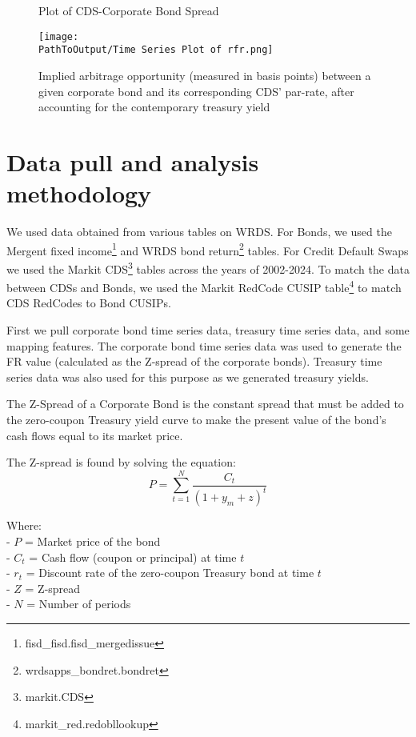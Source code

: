 \documentclass[12pt]{article}
\begin{document}
\begin{figure}
    \centering
    \caption{Plot of CDS-Corporate Bond Spread}
      \centering
      \texttt{[image: \\PathToOutput/Time Series Plot of rfr.png]}
    
    \caption*{
      Implied arbitrage opportunity (measured in basis points) between a given 
      corporate bond and its corresponding CDS' par-rate, after accounting for the 
      contemporary treasury yield
      }
    \end{figure}

\section{Data pull and analysis methodology}

We used data obtained from various tables on WRDS.
For Bonds, we used the Mergent fixed income\footnote{fisd\_fisd.fisd\_mergedissue} and 
WRDS bond return\footnote{wrdsapps\_bondret.bondret} tables.
For Credit Default Swaps we used the Markit CDS\footnote{markit.CDS}
tables across the years of 2002-2024. To match the data between CDSs and Bonds, we
used the Markit RedCode CUSIP table\footnote{markit\_red.redobllookup} to match 
CDS RedCodes to Bond CUSIPs.

First we pull corporate bond time series data, treasury time series data, 
and some mapping features. The corporate bond time series data was used to 
generate the FR value (calculated as the Z-spread of the corporate bonds). 
Treasury time series data was also used for this purpose as we generated treasury yields.

The Z-Spread of a Corporate Bond is the constant spread that must be added to 
the zero-coupon Treasury yield curve to make the present value of the bond's 
cash flows equal to its market price. 

The Z-spread is found by solving the equation:
\begin{equation}
    P = \sum_{t=1}^{N} \frac{C_t}{(1 + y_m + z)^t}
\end{equation}


Where: \\
- $P$ = Market price of the bond \\
- $C_t$ = Cash flow (coupon or principal) at time $t$ \\
- $r_t$ = Discount rate of the zero-coupon Treasury bond at time $t$ \\
- $Z$ = Z-spread \\
- $N$ = Number of periods \\
\end{document}
